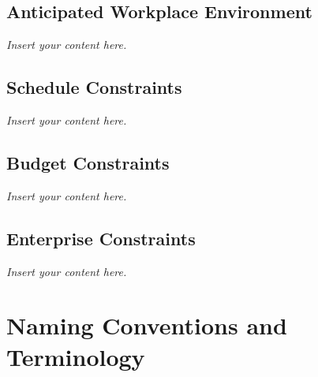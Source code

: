\documentclass[12pt]{article}
\newcommand{\lips}{\textit{Insert your content here.}}
\begin{document}
\subsection{Anticipated Workplace Environment}
\lips
\subsection{Schedule Constraints}
\lips
\subsection{Budget Constraints}
\lips
\subsection{Enterprise Constraints}
\lips

\section{Naming Conventions and Terminology}
\end{document}
